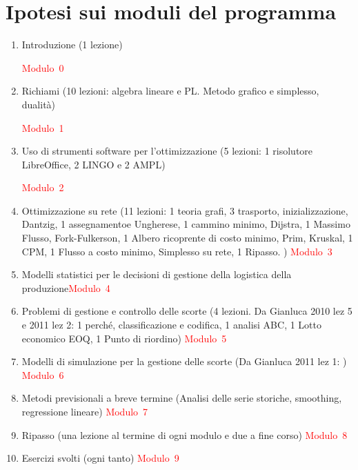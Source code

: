\documentclass[a4paper,10pt]{article}
\date{\today}
\begin{document}
 
\section{Ipotesi sui moduli del programma}

\def\modIntro{\hfill\hyperlink{mod:Intro}{\textcolor{red}{Modulo 0}}}
\def\modRichiami{\hfill\hyperlink{mod:Richiami}{\textcolor{red}{Modulo 1}}}
\def\modSw{\hfill\hyperlink{mod:Software}{\textcolor{red}{Modulo 2}}}

\begin{enumerate}
 \item \hypertarget{mod:Intro}{Introduzione (1 lezione)}\hfill\textcolor{red}{Modulo~0}
 
 \item \hypertarget{mod:Richiami}{Richiami (10 lezioni: algebra lineare e PL. Metodo grafico e simplesso, dualit\`a)}\hfill\textcolor{red}{Modulo~1}
 
  \item \hypertarget{mod:Software}{Uso di strumenti software per l'ottimizzazione (5 lezioni: 1 risolutore LibreOffice, 2 LINGO e 2 AMPL)}\hfill\textcolor{red}{Modulo~2}
  
 \item Ottimizzazione su rete (11 lezioni:
 	1 teoria grafi,
 	3 trasporto,
 	inizializzazione,
 	Dantzig,
 	1 assegnamentoe Ungherese,
 	1 cammino minimo, Dijstra,
 	1 Massimo Flusso, Fork-Fulkerson,
 	1 Albero ricoprente di costo minimo, Prim, Kruskal,
 	1 CPM, 
 	1 Flusso a costo minimo, Simplesso su rete,
 	1 Ripasso.
 ) \hfill\textcolor{red}{Modulo~3}
 
 \item Modelli statistici per le decisioni di gestione della logistica della produzione\hfill\textcolor{red}{Modulo~4}
 
 \item Problemi di gestione e controllo delle scorte
 (4 lezioni. Da Gianluca 2010 lez 5 e 2011 lez 2: 1 perch\'e, classificazione e codifica, 1 analisi ABC, 1 Lotto economico EOQ, 1 Punto di riordino) \hfill\textcolor{red}{Modulo~5}
 
 \item Modelli di simulazione per la gestione delle scorte
 (Da Gianluca 2011 lez 1: ) \hfill\textcolor{red}{Modulo~6}
 
 \item Metodi previsionali a breve termine
 (Analisi delle serie storiche, smoothing, regressione lineare)
 \hfill\textcolor{red}{Modulo~7}
 
  \item Ripasso (una lezione al termine di ogni modulo e due a fine corso)
  \hfill\textcolor{red}{Modulo~8}
  
  \item Esercizi svolti (ogni tanto)
  \hfill\textcolor{red}{Modulo~9}
\end{enumerate}
\end{document}
